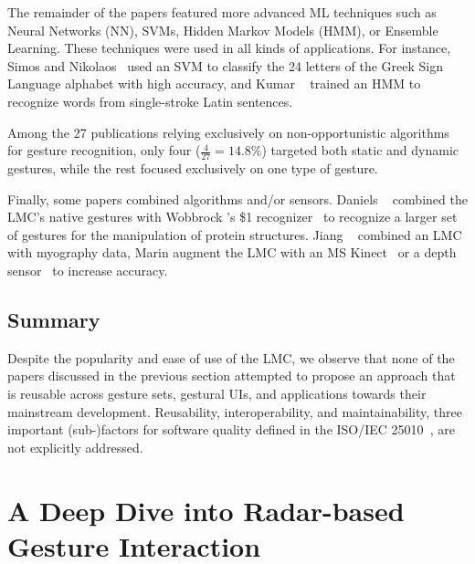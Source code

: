 The remainder of the papers featured more advanced ML techniques such as Neural Networks (NN), SVMs, Hidden Markov Models (HMM), or Ensemble Learning. These techniques were used in all kinds of applications. For instance, Simos and Nikolaos~\cite{Simos:2016} used an SVM to classify the 24 letters of the Greek Sign Language alphabet with high accuracy, and Kumar \etal~\cite{Kumar:2017a} trained an HMM to recognize words from single-stroke Latin sentences.

Among the 27 publications relying exclusively on non-opportunistic algorithms for gesture recognition, only four ($\frac{4}{27}{=}14.8\%$) targeted both static and dynamic gestures, while the rest focused exclusively on one type of gesture.

Finally, some papers combined algorithms and/or sensors. Daniels \etal~\cite{Daniels:2014} combined the LMC's native gestures with Wobbrock \etal's \$1 recognizer~\cite{Wobbrock:2007} to recognize a larger set of gestures for the manipulation of protein structures. Jiang \etal~\cite{Jiang:2018} combined an LMC with myography data, Marin \etal augment the LMC with an MS Kinect~\cite{Marin:2014} or a depth sensor~\cite{Marin:2016} to increase accuracy. 

\subsection{Summary} \label{sec:state_of_the_art:lmc:summary}
Despite the popularity and ease of use of the LMC, we observe that none of the papers discussed in the previous section attempted to propose an approach that is reusable across gesture sets, gestural UIs, and applications towards their mainstream development. Reusability, interoperability, and maintainability, three important (sub-)factors for software quality defined in the ISO/IEC 25010~\cite{iso25010}, are not explicitly addressed.


\section{A Deep Dive into Radar-based Gesture Interaction} \label{sec:state_of_the_art:radar}

